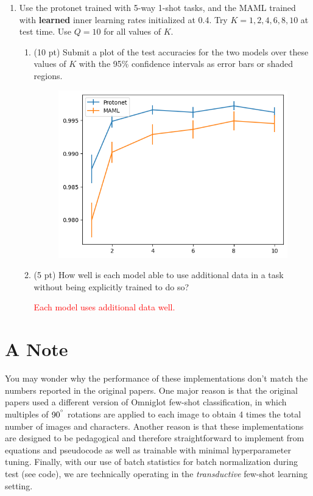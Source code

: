 \documentclass[12pt]{article}
\begin{document}
    \begin{enumerate}
        \item Use the protonet trained with 5-way 1-shot tasks, and the MAML trained with \textbf{learned} inner learning rates initialized at 0.4. Try $K = 1, 2, 4, 6, 8, 10$ at test time. Use $Q = 10$ for all values of $K$.
        \begin{enumerate}
            \item (10 pt) Submit a plot of the test accuracies for the two models over these values of $K$ with the 95\% confidence intervals as error bars or shaded regions.

            \begin{figure}[H]
                \centering
                \includegraphics[width=\linewidth]{figures/3.png}
            \end{figure}


            \item (5 pt) How well is each model able to use additional data in a task without being explicitly trained to do so?

            \textcolor{red}{Each model uses additional data well.}

        \end{enumerate}
    \end{enumerate}

    \newpage
    \section*{A Note}
    You may wonder why the performance of these implementations don't match the numbers reported in the original papers. One major reason is that the original papers used a different version of Omniglot few-shot classification, in which multiples of $90^{\degree}$ rotations are applied to each image to obtain 4 times the total number of images and characters. Another reason is that these implementations are designed to be pedagogical and therefore straightforward to implement from equations and pseudocode as well as trainable with minimal hyperparameter tuning. Finally, with our use of batch statistics for batch normalization during test (see code), we are technically operating in the \emph{transductive} few-shot learning setting.

    \newpage
    
    
\end{document}
